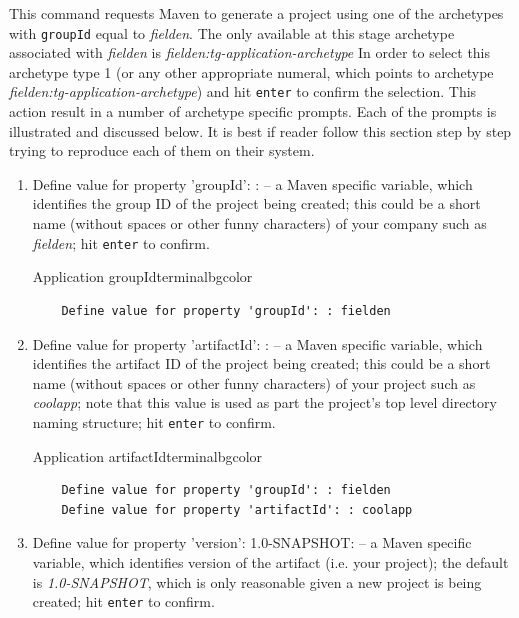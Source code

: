   This command requests Maven to generate a project using one of the archetypes with \texttt{groupId} equal to \emph{fielden}.
  The only available at this stage archetype associated with \emph{fielden} is \emph{fielden:tg-application-archetype}
  In order to select this archetype type 1 (or any other appropriate numeral, which points to archetype \emph{fielden:tg-application-archetype}) and hit \texttt{enter} to confirm the selection. 
  This action result in a number of archetype specific prompts. 
  Each of the prompts is illustrated and discussed below.
  It is best if reader follow this section step by step trying to reproduce each of them on their system.

  \begin{enumerate}
    \item Define value for property 'groupId': : -- a Maven specific variable, which identifies the group ID of the project being created; this could be a short name (without spaces or other funny characters) of your company such as \emph{fielden}; hit \texttt{enter} to confirm.
      
    \begin{code}{Application groupId}{\label{lst:archetype-groupId}}{terminalbgcolor}
      \begin{lstlisting}
	Define value for property 'groupId': : fielden		
      \end{lstlisting}
    \end{code}

    \item Define value for property 'artifactId': : -- a Maven specific variable, which identifies the artifact ID of the project being created; this could be a short name (without spaces or other funny characters) of your project such as \emph{coolapp}; note that this value is used as part the project's top level directory naming structure; hit \texttt{enter} to confirm.
    
    \begin{code}{Application artifactId}{\label{lst::archetype-archetypeId}}{terminalbgcolor}
      \begin{lstlisting}
	Define value for property 'groupId': : fielden		
	Define value for property 'artifactId': : coolapp
      \end{lstlisting}
    \end{code}

    \item Define value for property 'version': 1.0-SNAPSHOT: -- a Maven specific variable, which identifies version of the artifact (i.e. your project); the default is \emph{1.0-SNAPSHOT}, which is only reasonable given a new project is being created; hit \texttt{enter} to confirm.
    

\end{enumerate}
